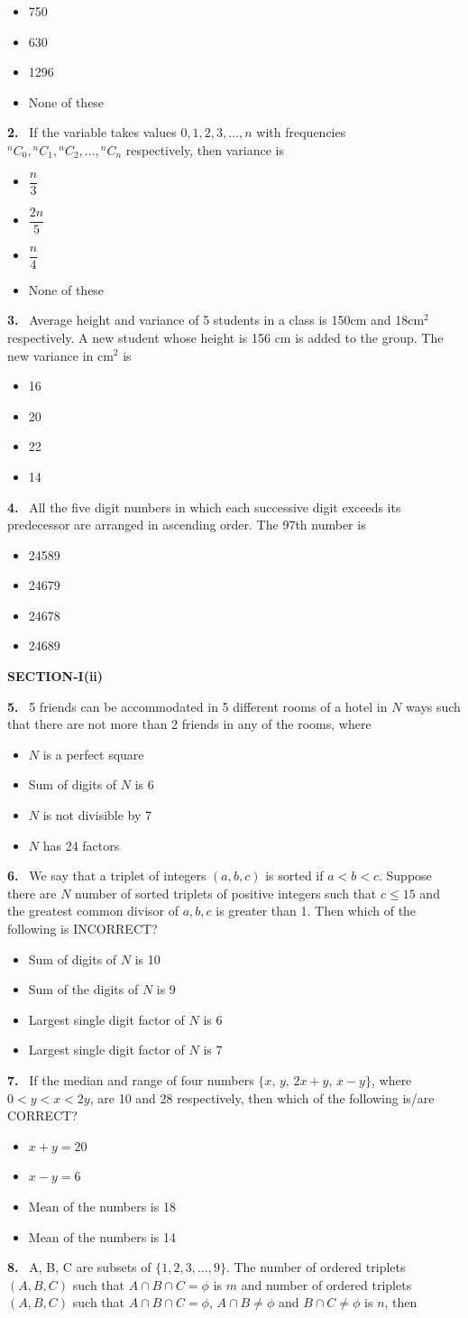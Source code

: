 \documentclass[10pt]{extarticle}
\newcommand{\sect}[1]{\par\smallskip\noindent\textbf{#1}\par}
\newcommand{\qn}[1]{\par\smallskip\noindent\textbf{#1.}~}
\newenvironment{qoptions}{\begin{itemize}[leftmargin=1.8em,itemsep=1pt,topsep=2pt,label={}]}{\end{itemize}}
\newcommand{\opt}[2]{\item[(#1)] #2}
\begin{document}
\begin{multicols}{2}
\begin{qoptions}
\opt{A}{750}
\opt{B}{630}
\opt{C}{1296}
\opt{D}{None of these}
\end{qoptions}
\qn{2} If the variable takes values $0,1,2,3,\dots,n$ with frequencies ${}^nC_0,{}^nC_1,{}^nC_2,\dots,{}^nC_n$ respectively, then variance is
\begin{qoptions}
\opt{A}{$\dfrac n3$}
\opt{B}{$\dfrac{2n}5$}
\opt{C}{$\dfrac n4$}
\opt{D}{None of these}
\end{qoptions}
\qn{3} Average height and variance of 5 students in a class is 150cm and 18cm$^2$ respectively. A new student whose height is 156 cm is added to the group. The new variance in cm$^2$ is
\begin{qoptions}
\opt{A}{16}
\opt{B}{20}
\opt{C}{22}
\opt{D}{14}
\end{qoptions}
\qn{4} All the five digit numbers in which each successive digit exceeds its predecessor are arranged in ascending order. The 97th number is
\begin{qoptions}
\opt{A}{24589}
\opt{B}{24679}
\opt{C}{24678}
\opt{D}{24689}
\end{qoptions}
\sect{SECTION-I(ii)}
\qn{5} 5 friends can be accommodated in 5 different rooms of a hotel in $N$ ways such that there are not more than 2 friends in any of the rooms, where
\begin{qoptions}
\opt{A}{$N$ is a perfect square}
\opt{B}{Sum of digits of $N$ is 6}
\opt{C}{$N$ is not divisible by 7}
\opt{D}{$N$ has 24 factors}
\end{qoptions}
\qn{6} We say that a triplet of integers $(a,b,c)$ is sorted if $a<b<c$. Suppose there are $N$ number of sorted triplets of positive integers such that $c\le15$ and the greatest common divisor of $a,b,c$ is greater than 1. Then which of the following is INCORRECT?
\begin{qoptions}
\opt{A}{Sum of digits of $N$ is 10}
\opt{B}{Sum of the digits of $N$ is 9}
\opt{C}{Largest single digit factor of $N$ is 6}
\opt{D}{Largest single digit factor of $N$ is 7}
\end{qoptions}
\qn{7} If the median and range of four numbers $\{x,\,y,\,2x+y,\,x-y\}$, where $0<y<x<2y$, are 10 and 28 respectively, then which of the following is/are CORRECT?
\begin{qoptions}
\opt{A}{$x+y=20$}
\opt{B}{$x-y=6$}
\opt{C}{Mean of the numbers is 18}
\opt{D}{Mean of the numbers is 14}
\end{qoptions}
\qn{8} A, B, C are subsets of $\{1,2,3,\dots,9\}$. The number of ordered triplets $(A,B,C)$ such that $A\cap B\cap C=\phi$ is $m$ and number of ordered triplets $(A,B,C)$ such that $A\cap B\cap C=\phi$, $A\cap B\ne\phi$ and $B\cap C\ne\phi$ is $n$, then

\end{multicols}
\end{document}

